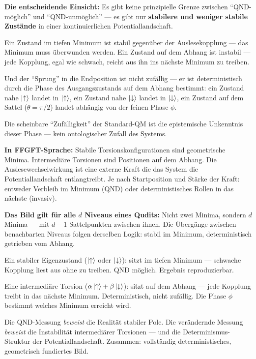 \begin{foundation}
\textbf{Die entscheidende Einsicht:}
Es gibt keine prinzipielle Grenze zwischen
``QND-möglich'' und ``QND-unmöglich'' ---
es gibt nur \textbf{stabilere und weniger stabile Zustände}
in einer kontinuierlichen Potentiallandschaft.

Ein Zustand im tiefen Minimum ist stabil gegenüber
der Auslesekopplung --- das Minimum muss überwunden werden.
Ein Zustand auf dem Abhang ist instabil ---
jede Kopplung, egal wie schwach, reicht aus ihn
ins nächste Minimum zu treiben.

Und der ``Sprung'' in die Endposition ist nicht zufällig ---
er ist deterministisch durch die Phase des Ausgangszustands
auf dem Abhang bestimmt:
ein Zustand nahe $\left|\uparrow\right\rangle$ landet in $\left|\uparrow\right\rangle$,
ein Zustand nahe $\left|\downarrow\right\rangle$ landet in $\left|\downarrow\right\rangle$,
ein Zustand auf dem Sattel ($\theta = \pi/2$) landet
abhängig von der feinen Phase $\phi$.

Die scheinbare ``Zufälligkeit'' der Standard-QM
ist die epistemische Unkenntnis dieser Phase ---
kein ontologischer Zufall des Systems.

\textbf{In FFGFT-Sprache:}
Stabile Torsionskonfigurationen sind geometrische Minima.
Intermediäre Torsionen sind Positionen auf dem Abhang.
Die Auslesewechselwirkung ist eine externe Kraft
die das System die Potentiallandschaft entlangtreibt.
Je nach Startposition und Stärke der Kraft:
entweder Verbleib im Minimum (QND)
oder deterministisches Rollen in das nächste (invasiv).

\textbf{Das Bild gilt für alle $d$ Niveaus eines Qudits:}
Nicht zwei Minima, sondern $d$ Minima ---
mit $d-1$ Sattelpunkten zwischen ihnen.
Die Übergänge zwischen benachbarten Niveaus
folgen derselben Logik: stabil im Minimum,
deterministisch getrieben vom Abhang.
\end{foundation}

\begin{keypoint}
Ein stabiler Eigenzustand ($\left|\uparrow\right\rangle$ oder $\left|\downarrow\right\rangle$):
sitzt im tiefen Minimum --- schwache Kopplung liest aus
ohne zu treiben. QND möglich. Ergebnis reproduzierbar.

Eine intermediäre Torsion ($\alpha\left|\uparrow\right\rangle+\beta\left|\downarrow\right\rangle$):
sitzt auf dem Abhang --- jede Kopplung treibt
in das nächste Minimum. Deterministisch, nicht zufällig.
Die Phase $\phi$ bestimmt welches Minimum erreicht wird.

Die QND-Messung \emph{beweist} die Realität stabiler Pole.
Die verändernde Messung \emph{beweist} die Instabilität
intermediärer Torsionen --- und die Determinismus-Struktur
der Potentiallandschaft.
Zusammen: vollständig deterministisches,
geometrisch fundiertes Bild.
\end{keypoint}

